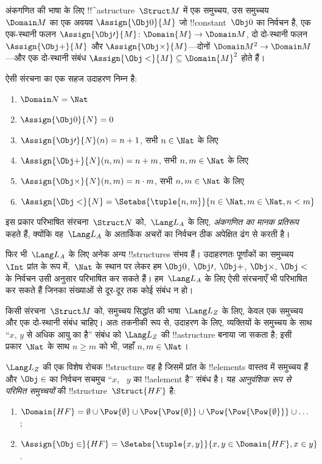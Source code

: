 \documentclass[../../../include/open-logic-section]{subfiles}
\begin{document}
\begin{ex}
अंकगणित की भाषा के लिए !!^a{structure}~$\Struct M$ में एक समुच्चय, उस
समुच्चय $\Domain M$ का एक अवयव $\Assign{\Obj 0}{M}$ जो
!!{constant}~$\Obj 0$ का निर्वचन है, एक एक-स्थानी फलन
$\Assign{\Obj \prime}{M} \colon \Domain{M} \to \Domain M$, दो दो-स्थानी
फलन $\Assign{\Obj +}{M}$ और $\Assign{\Obj
    \times}{M}$---दोनों
$\Domain M^2 \to \Domain M$---और एक दो-स्थानी संबंध
$\Assign{\Obj <}{M} \subseteq \Domain{M}^2$ होते हैं।

ऐसी संरचना का एक सहज उदाहरण निम्न है:
\begin{enumerate}
\item $\Domain N = \Nat$
\item $\Assign{\Obj 0}{N} = 0$
\item $\Assign{\Obj \prime}{N}(n) = n + 1$, सभी $n \in \Nat$ के लिए
\item $\Assign{\Obj +}{N}(n, m) = n + m$, सभी $n, m \in \Nat$ के लिए
\item $\Assign{\Obj \times}{N}(n, m) = n\cdot m$, सभी $n, m \in \Nat$ के लिए
\item $\Assign{\Obj <}{N} = \Setabs{\tuple{n, m}}{n \in \Nat, m \in
  \Nat, n < m}$
\end{enumerate}
इस प्रकार परिभाषित संरचना~$\Struct N$ को,~$\Lang L_A$ के लिए,
\emph{अंकगणित का मानक प्रतिरूप} कहते हैं, क्योंकि वह~$\Lang L_A$ के
अतार्किक अचरों का निर्वचन ठीक अपेक्षित ढंग से करती है।

फिर भी~$\Lang
L_A$ के लिए अनेक अन्य !!{structure}s संभव हैं। उदाहरणतः पूर्णांकों का
समुच्चय~$\Int$ प्रांत के रूप में,~$\Nat$ के स्थान पर लेकर हम $\Obj
0$, $\Obj \prime$, $\Obj +$, $\Obj \times$, $\Obj <$ के निर्वचन उसी
अनुसार परिभाषित कर सकते हैं। हम~$\Lang L_A$ के लिए ऐसी संरचनाएँ भी
परिभाषित कर सकते हैं जिनका संख्याओं से दूर-दूर तक कोई संबंध न हो।
\end{ex}

\begin{ex}
किसी संरचना~$\Struct M$ को, समुच्चय सिद्धांत की भाषा~$\Lang L_Z$ के लिए,
केवल एक समुच्चय और एक दो-स्थानी संबंध चाहिए। अतः तकनीकी रूप से, उदाहरण के
लिए, व्यक्तियों के समुच्चय के साथ ``$x$, $y$ से अधिक आयु का है'' संबंध को
$\Lang L_Z$ की !!a{structure} बनाया जा सकता है; इसी प्रकार~$\Nat$ के साथ
$n \ge m$ को भी, जहाँ $n, m \in \Nat$।

$\Lang L_Z$ की एक विशेष रोचक !!{structure} वह है जिसमें प्रांत के
!!{element}s वास्तव में समुच्चय हैं और $\Obj \in$ का निर्वचन सचमुच ``$x$,
~$y$ का !!a{element} है'' संबंध है। यह \emph{आनुवंशिक रूप से परिमित
समुच्चयों} की !!{structure}~$\Struct{{HF}}$ है:
\begin{enumerate}
\item $\Domain{{{HF}}} = \emptyset \cup \Pow{\emptyset} \cup
  \Pow{\Pow{\emptyset}} \cup \Pow{\Pow{\Pow{\emptyset}}} \cup \dots$;
\item $\Assign{\Obj \in}{{{HF}}} = \Setabs{\tuple{x, y}}{x, y \in
  \Domain{{{HF}}}, x \in y}$.
\end{enumerate}
\end{ex}
\end{document}

